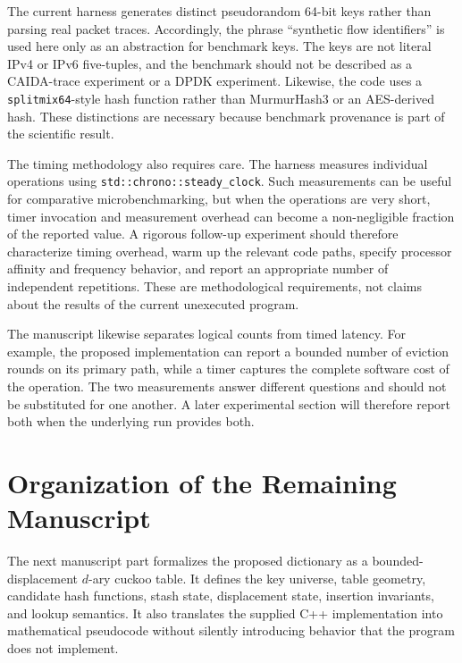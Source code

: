 \documentclass[conference]{IEEEtran}
\begin{document}
The current harness generates distinct pseudorandom 64-bit keys rather than parsing real packet traces. Accordingly, the phrase ``synthetic flow identifiers'' is used here only as an abstraction for benchmark keys. The keys are not literal IPv4 or IPv6 five-tuples, and the benchmark should not be described as a CAIDA-trace experiment or a DPDK experiment. Likewise, the code uses a \texttt{splitmix64}-style hash function rather than MurmurHash3 or an AES-derived hash. These distinctions are necessary because benchmark provenance is part of the scientific result.

The timing methodology also requires care. The harness measures individual operations using \texttt{std::chrono::steady\_clock}. Such measurements can be useful for comparative microbenchmarking, but when the operations are very short, timer invocation and measurement overhead can become a non-negligible fraction of the reported value. A rigorous follow-up experiment should therefore characterize timing overhead, warm up the relevant code paths, specify processor affinity and frequency behavior, and report an appropriate number of independent repetitions. These are methodological requirements, not claims about the results of the current unexecuted program.

The manuscript likewise separates logical counts from timed latency. For example, the proposed implementation can report a bounded number of eviction rounds on its primary path, while a timer captures the complete software cost of the operation. The two measurements answer different questions and should not be substituted for one another. A later experimental section will therefore report both when the underlying run provides both.

\section{Organization of the Remaining Manuscript}

The next manuscript part formalizes the proposed dictionary as a bounded-displacement $d$-ary cuckoo table. It defines the key universe, table geometry, candidate hash functions, stash state, displacement state, insertion invariants, and lookup semantics. It also translates the supplied C++ implementation into mathematical pseudocode without silently introducing behavior that the program does not implement.
\end{document}
